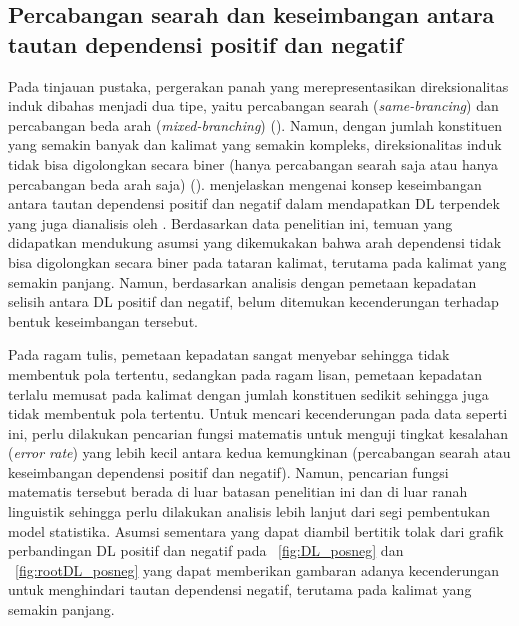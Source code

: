 \subsection{Percabangan searah dan keseimbangan antara tautan dependensi positif dan negatif}
Pada tinjauan pustaka, pergerakan panah yang merepresentasikan direksionalitas induk dibahas menjadi dua tipe, yaitu percabangan searah (\textit{same-brancing}) dan percabangan beda arah (\textit{mixed-branching}) (\citealp{hawkins1994performance, frazier1985syntactic}). Namun, dengan jumlah konstituen yang semakin banyak dan kalimat yang semakin kompleks, direksionalitas induk tidak bisa digolongkan secara biner (hanya percabangan searah saja atau hanya percabangan beda arah saja) (\citealp{dryer1992greenbergian, temperley2008dependency}). \cite{gildea2010grammars} menjelaskan mengenai konsep keseimbangan antara tautan dependensi positif dan negatif dalam mendapatkan DL terpendek yang juga dianalisis oleh \citep{dryer1992greenbergian}. Berdasarkan data penelitian ini, temuan yang didapatkan mendukung asumsi yang dikemukakan \cite{dryer1992greenbergian} bahwa arah dependensi tidak bisa digolongkan secara biner pada tataran kalimat, terutama pada kalimat yang semakin panjang. Namun, berdasarkan analisis dengan pemetaan kepadatan selisih antara DL positif dan negatif, belum ditemukan kecenderungan terhadap bentuk keseimbangan tersebut. 

Pada ragam tulis, pemetaan kepadatan sangat menyebar sehingga tidak membentuk pola tertentu, sedangkan pada ragam lisan, pemetaan kepadatan terlalu memusat pada kalimat dengan jumlah konstituen sedikit sehingga juga tidak membentuk pola tertentu. Untuk mencari kecenderungan pada data seperti ini, perlu dilakukan pencarian fungsi matematis untuk menguji tingkat kesalahan (\textit{error rate}) yang lebih kecil antara kedua kemungkinan (percabangan searah atau keseimbangan dependensi positif dan negatif). Namun, pencarian fungsi matematis tersebut berada di luar batasan penelitian ini dan di luar ranah linguistik sehingga perlu dilakukan analisis lebih lanjut dari segi pembentukan model statistika. Asumsi sementara yang dapat diambil bertitik tolak dari grafik perbandingan DL positif dan negatif pada \pic~\ref{fig:DL_posneg} dan \pic~\ref{fig:rootDL_posneg} yang dapat memberikan gambaran adanya kecenderungan untuk menghindari tautan dependensi negatif, terutama pada kalimat yang semakin panjang.

